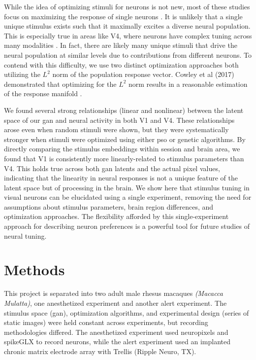 While the idea of optimizing stimuli for neurons is not new, most of these studies focus on maximizing the response of single neurons \parencite{Ponce2019, Bashivan2019}.  It is unlikely that a single unique stimulus exists such that it maximally excites a diverse neural population. This is especially true in areas like V4, where neurons have complex tuning across many modalities \parencite{Pasupathy2002}. In fact, there are likely many unique stimuli that drive the neural population at similar levels due to contributions from different neurons. To contend with this difficulty, we use two distinct optimization approaches both utilizing the $L^2$ norm of the population response vector. Cowley et al (2017) demonstrated that optimizing for the $L^2$ norm results in a reasonable estimation of the response manifold \parencite{Cowley2017}.

We found several strong relationships (linear and nonlinear) between the latent space of our \gls{gan} and neural activity in both V1 and V4. These relationships arose even when random stimuli were shown, but they were systematically stronger when stimuli were optimized using either \gls{pso} or genetic algorithms. By directly comparing the stimulus embeddings within session and brain area, we found that V1 is consistently more linearly-related to stimulus parameters than V4. This holds true across both \gls{gan} latents and the actual pixel values, indicating that the linearity in neural responses is not a unique feature of the latent space but of processing in the brain. We show here that stimulus tuning in visual neurons can be elucidated using a single experiment, removing the need for assumptions about stimulus parameters, brain region differences, and optimization approaches. The flexibility afforded by this single-experiment approach for describing neuron preferences is a powerful tool for future studies of neural tuning.


\section{Methods}

This project is separated into two adult male rhesus macaques \textit{(Macacca Mulatta)}, one anesthetized experiment and another alert experiment. The stimulus space (\gls{gan}), optimization algorithms, and experimental design (series of static images) were held constant across experiments, but recording methodologies differed. The anesthetized experiment used neuropixels and spikeGLX to record neurons, while the alert experiment used an implanted chronic matrix electrode array with Trellis (Ripple Neuro, TX). 


